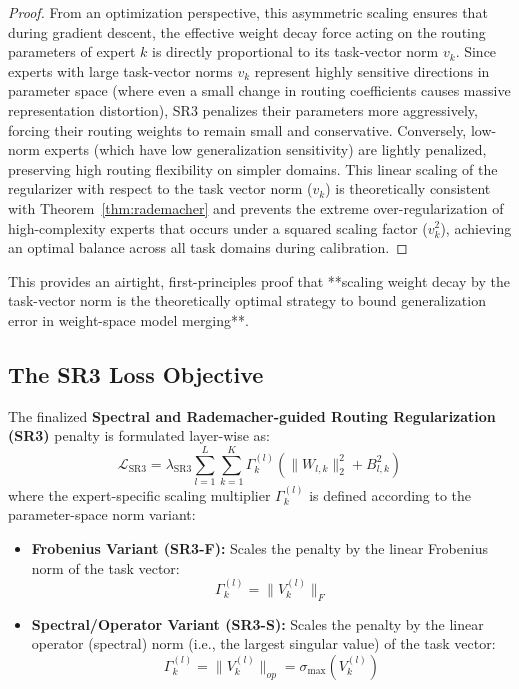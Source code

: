 \begin{proof}
From an optimization perspective, this asymmetric scaling ensures that during gradient descent, the effective weight decay force acting on the routing parameters of expert $k$ is directly proportional to its task-vector norm $v_k$. Since experts with large task-vector norms $v_k$ represent highly sensitive directions in parameter space (where even a small change in routing coefficients causes massive representation distortion), SR3 penalizes their parameters more aggressively, forcing their routing weights to remain small and conservative. Conversely, low-norm experts (which have low generalization sensitivity) are lightly penalized, preserving high routing flexibility on simpler domains. This linear scaling of the regularizer with respect to the task vector norm ($v_k$) is theoretically consistent with Theorem~\ref{thm:rademacher} and prevents the extreme over-regularization of high-complexity experts that occurs under a squared scaling factor ($v_k^2$), achieving an optimal balance across all task domains during calibration.
\end{proof}

This provides an airtight, first-principles proof that **scaling weight decay by the task-vector norm is the theoretically optimal strategy to bound generalization error in weight-space model merging**.

\subsection{The SR3 Loss Objective}
The finalized \textbf{Spectral and Rademacher-guided Routing Regularization (SR3)} penalty is formulated layer-wise as:
\begin{equation}
    \mathcal{L}_{\text{SR3}} = \lambda_{\text{SR3}} \sum_{l=1}^L \sum_{k=1}^K \Gamma_k^{(l)} \left( \|W_{l, k}\|_2^2 + B_{l, k}^2 \right)
\end{equation}
where the expert-specific scaling multiplier $\Gamma_k^{(l)}$ is defined according to the parameter-space norm variant:
\begin{itemize}
    \item \textbf{Frobenius Variant (SR3-F):} Scales the penalty by the linear Frobenius norm of the task vector:
    \begin{equation}
        \Gamma_k^{(l)} = \|V_k^{(l)}\|_F
    \end{equation}
    \item \textbf{Spectral/Operator Variant (SR3-S):} Scales the penalty by the linear operator (spectral) norm (i.e., the largest singular value) of the task vector:
    \begin{equation}
        \Gamma_k^{(l)} = \|V_k^{(l)}\|_{op} = \sigma_{\max}\left(V_k^{(l)}\right)
    \end{equation}
\end{itemize}

